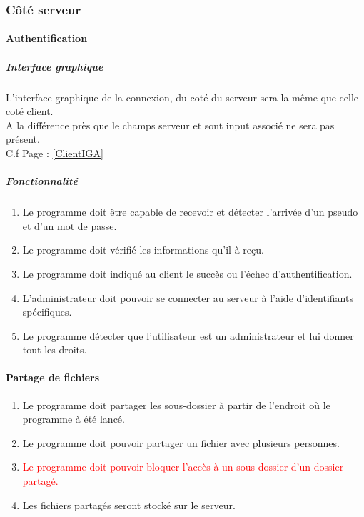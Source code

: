 \documentclass[10pt,a4paper]{report}
\begin{document}
\subsubsection{Côté serveur}
\paragraph{Authentification}
	
	\subparagraph{Interface graphique}
		L'interface graphique de la connexion, du coté du serveur sera la même que celle coté client.\\
		A la différence près que le champs serveur et sont input associé ne sera pas présent.\\
		C.f Page \pageref{ClientIGA} : \ref{ClientIGA}
	\subparagraph{Fonctionnalité}
	\begin{enumerate}
		\item Le programme doit être capable de recevoir et détecter l'arrivée d'un pseudo et d'un mot de passe.
		\item Le programme doit vérifié les informations qu'il à reçu.
		\item Le programme doit indiqué au client le succès ou l'échec d'authentification.
		\item L'administrateur doit pouvoir se connecter au serveur à l'aide d'identifiants spécifiques.
		\item Le programme détecter que l'utilisateur est un administrateur et lui donner tout les droits.	
	\end{enumerate}
	
\paragraph{Partage de fichiers}
	\begin{enumerate}
		\item Le programme doit partager les sous-dossier à partir de l'endroit où le programme à été lancé.
		\item Le programme doit pouvoir partager un fichier avec plusieurs personnes.
		\item \textcolor{red}{Le programme doit pouvoir bloquer l'accès à un sous-dossier d'un dossier partagé. }
		\item Les fichiers partagés seront stocké sur le serveur.
	\end{enumerate}
	
\end{document}
